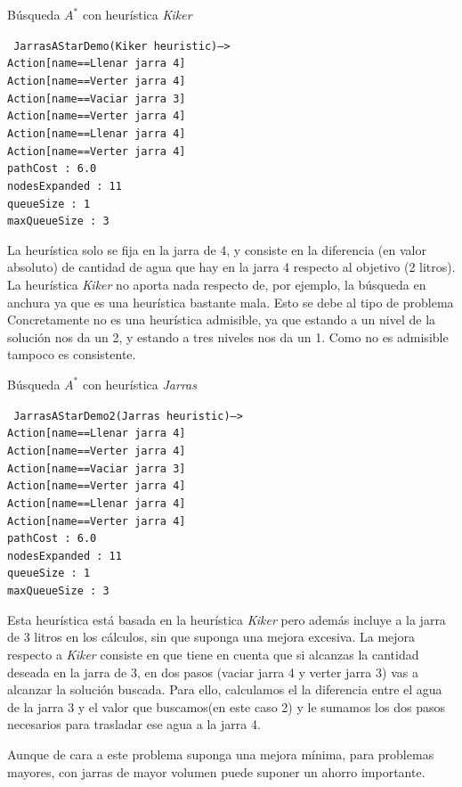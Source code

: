 \documentclass[11pt, a4paper, spanish, openright, twoside]{book}
\begin{document}
\begin{section}{Búsqueda $A^*$ con heurística \textit{Kiker}}

\texttt{
	JarrasAStarDemo(Kiker heuristic)-->	\\
	Action[name==Llenar jarra 4]		\\
	Action[name==Verter jarra 4]		\\
	Action[name==Vaciar jarra 3]		\\
	Action[name==Verter jarra 4]		\\
	Action[name==Llenar jarra 4]		\\
	Action[name==Verter jarra 4]		\\
	pathCost : 6.0					\\
	nodesExpanded : 11			\\
	queueSize : 1					\\
	maxQueueSize : 3				
}

La heurística solo se fija en la jarra de 4, y consiste en la diferencia (en valor absoluto)  de cantidad de agua que hay en la jarra 4 respecto al objetivo (2 litros).
La heurística  \textit{Kiker} no aporta nada respecto de, por ejemplo, la búsqueda en anchura ya que es una heurística bastante mala. Esto se debe al tipo de problema Concretamente no es 
una heurística admisible, ya que estando a un nivel de la solución nos da un 2, y estando a tres niveles nos da un 1. Como no es admisible tampoco es consistente.


\end{section}
\begin{section}{Búsqueda $A^*$ con heurística \textit{Jarras}}

\texttt{
 	JarrasAStarDemo2(Jarras heuristic)-->	\\
 	Action[name==Llenar jarra 4]	\\
 	Action[name==Verter jarra 4]	\\
 	Action[name==Vaciar jarra 3]	\\
 	Action[name==Verter jarra 4]	\\
 	Action[name==Llenar jarra 4]	\\
	Action[name==Verter jarra 4]	\\
	pathCost : 6.0	\\
	nodesExpanded : 11	\\
	queueSize : 1	\\
 	maxQueueSize : 3	 
}

Esta heurística está basada en la heurística \textit{Kiker} pero además incluye a la jarra de 3 litros en los cálculos, sin que suponga una mejora excesiva. La mejora respecto a \textit{Kiker} consiste en que tiene en cuenta que si alcanzas la cantidad 
deseada en la jarra de 3, en dos pasos (vaciar jarra 4 y verter jarra 3) vas a alcanzar la solución buscada. Para ello, calculamos el la diferencia entre el agua de la jarra 3 y el valor que buscamos(en este caso 2) y le sumamos los dos pasos necesarios para trasladar 
ese agua a la jarra 4. 

Aunque de cara a este problema suponga una mejora mínima, para problemas mayores, con jarras de mayor volumen puede suponer un ahorro importante.

\end{section}
\end{document}
